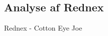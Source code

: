 \documentclass[12pt, letterpaper]{article}
\begin{document}
\begin{figure}[!h]
           \begin{floatrow}
       
           \end{floatrow}
\end{figure}


\newpage

\subsection{Analyse af Rednex}
Rednex - Cotton Eye Joe 
\end{document}
